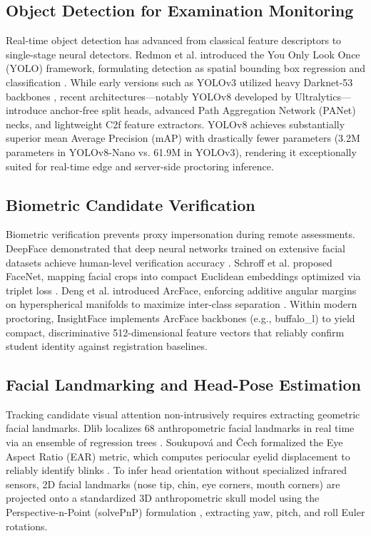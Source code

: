 \documentclass[conference]{IEEEtran}
\begin{document}
\subsection{Object Detection for Examination Monitoring}
Real-time object detection has advanced from classical feature descriptors to single-stage neural detectors. Redmon et al. introduced the You Only Look Once (YOLO) framework, formulating detection as spatial bounding box regression and classification \cite{yolo1}. While early versions such as YOLOv3 utilized heavy Darknet-53 backbones \cite{yolov3}, recent architectures—notably YOLOv8 developed by Ultralytics—introduce anchor-free split heads, advanced Path Aggregation Network (PANet) necks, and lightweight C2f feature extractors. YOLOv8 achieves substantially superior mean Average Precision (mAP) with drastically fewer parameters (3.2M parameters in YOLOv8-Nano vs. 61.9M in YOLOv3), rendering it exceptionally suited for real-time edge and server-side proctoring inference.

\subsection{Biometric Candidate Verification}
Biometric verification prevents proxy impersonation during remote assessments. DeepFace demonstrated that deep neural networks trained on extensive facial datasets achieve human-level verification accuracy \cite{deepface}. Schroff et al. proposed FaceNet, mapping facial crops into compact Euclidean embeddings optimized via triplet loss \cite{facenet}. Deng et al. introduced ArcFace, enforcing additive angular margins on hyperspherical manifolds to maximize inter-class separation \cite{arcface}. Within modern proctoring, InsightFace implements ArcFace backbones (e.g., buffalo\_l) to yield compact, discriminative 512-dimensional feature vectors that reliably confirm student identity against registration baselines.

\subsection{Facial Landmarking and Head-Pose Estimation}
Tracking candidate visual attention non-intrusively requires extracting geometric facial landmarks. Dlib localizes 68 anthropometric facial landmarks in real time via an ensemble of regression trees \cite{dlib}. Soukupov{\'a} and {\v{C}}ech formalized the Eye Aspect Ratio (EAR) metric, which computes periocular eyelid displacement to reliably identify blinks \cite{ear}. To infer head orientation without specialized infrared sensors, 2D facial landmarks (nose tip, chin, eye corners, mouth corners) are projected onto a standardized 3D anthropometric skull model using the Perspective-n-Point (solvePnP) formulation \cite{openface}, extracting yaw, pitch, and roll Euler rotations.
\end{document}
